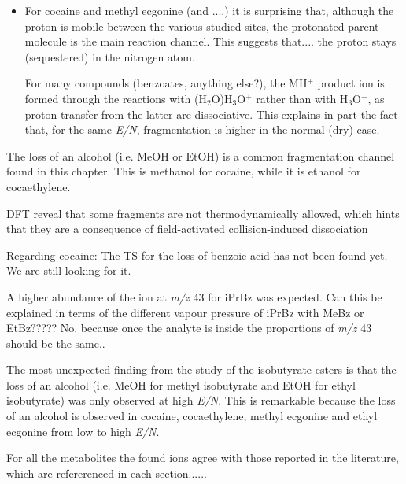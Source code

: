 \begin{itemize}
\item For cocaine and methyl ecgonine (and ....) it is surprising that, although the proton is mobile between the various studied sites, the protonated parent molecule is the main reaction channel. 
This suggests that.... the proton stays (sequestered) in the nitrogen atom.


For many compounds (benzoates, anything else?), the MH$^+$ product ion is formed through the reactions with (H$_2$O)H$_3$O$^+$ rather than with H$_3$O$^+$, as proton transfer from the latter are dissociative. This explains in part the fact that, for the same \textit{E/N}, fragmentation is higher in the normal (dry) case.





\end{itemize}


The loss of an alcohol (i.e. MeOH or EtOH) is a common fragmentation channel found in this chapter.
This is methanol for cocaine, while it is ethanol for cocaethylene.

DFT reveal that some fragments are not thermodynamically allowed, which hints that they are a consequence of field-activated collision-induced dissociation

Regarding cocaine:
The TS for the loss of benzoic acid has not been found yet. We are still looking for it.


A higher abundance of the ion at \textit{m/z} 43 for iPrBz was expected. Can this be explained in terms of the different vapour pressure of iPrBz with MeBz or EtBz????? No, because once the analyte is inside the proportions of \textit{m/z} 43 should be the same..


The most unexpected finding from the study of the isobutyrate esters is that the loss of an alcohol (i.e. MeOH for methyl isobutyrate and EtOH for ethyl isobutyrate) was only observed at high \textit{E/N}.
%
This is remarkable because the loss of an alcohol is observed in cocaine, cocaethylene, methyl ecgonine and ethyl ecgonine from low to high \textit{E/N}. 



For all the metabolites the found ions agree with those reported in the literature, which are refererenced in each section......




